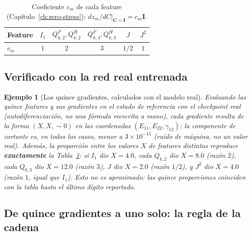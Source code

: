 \documentclass[11pt,a4paper]{article}
\newtheorem{ejemplo}{Ejemplo}
\begin{document}
\begin{table}[h]
\centering
\caption{Coeficiente $c_m$ de cada feature (Cap\'itulo~\ref{ch:zero-stress}):
$dz_m/dC|_{\bm C=\bm I}=c_m\bm I$.}
\label{tab:appB-coefficients}
\begin{tabular}{lccccc}
\toprule
Feature & $I_1$ & $Q_{k,2}^F,Q_{k,2}^H$ & $Q_{k,3}^F,Q_{k,3}^H$ & $J$ & $J^2$\\
\midrule
$c_m$ & $1$ & $2$ & $3$ & $1/2$ & $1$\\
\bottomrule
\end{tabular}
\end{table}

\subsection{Verificado con la red real entrenada}

\begin{ejemplo}[Los quince gradientes, calculados con el modelo real]
\label{ex:appB-fifteen-gradients}
Evaluando las quince features y sus gradientes en el estado de
referencia con el checkpoint real (autodiferenciaci\'on, no una
f\'ormula reescrita a mano), cada gradiente resulta de la forma
$(X,X,\sim\!0)$ en las coordenadas $(E_{11},E_{22},\gamma_{12})$: la
componente de cortante es, en todos los casos, menor a
$3\times10^{-15}$ (ruido de m\'aquina, no un valor real). Adem\'as, la
proporci\'on entre los valores $X$ de features distintas reproduce
\textbf{exactamente} la Tabla~\ref{tab:appB-coefficients}: si $I_1$ dio
$X=4.0$, cada $Q_{k,2}$ dio $X=8.0$ (raz\'on $2$), cada $Q_{k,3}$ dio
$X=12.0$ (raz\'on $3$), $J$ dio $X=2.0$ (raz\'on $1/2$), y $J^2$ dio
$X=4.0$ (raz\'on $1$, igual que $I_1$). Esto no es aproximado: las
quince proporciones coinciden con la tabla hasta el \'ultimo d\'igito
reportado.
\end{ejemplo}

\subsection{De quince gradientes a uno solo: la regla de la cadena}
\end{document}
